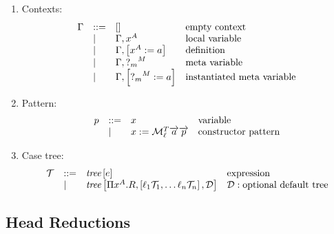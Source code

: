 \begin{enumerate}
    \item Contexts:
        $$
        \begin{array}{lllll} 
            \Gamma
            &::=&
            []
            &\text{empty context}
            \\
            &\mid&
            \Gamma, x^A
            &\text{local variable}
            \\
            &\mid&
            \Gamma, \left[ {x^A := a} \right]
            &\text{definition}
            \\
            &\mid&
            \Gamma, {?_{m}}^M
            &\text{meta variable}
            \\
            &\mid&
            \Gamma, \left[ {{?_{m}}^M := a} \right]
            &\text{instantiated meta variable}
         \end{array}
        $$

    \item Pattern:
        $$
        \begin{array}{lllll} 
            p &::=& x & \text{variable}
            \\
            &\mid& x := {\cal M}^T_\ell {\overrightarrow {a}} {\overrightarrow {p}}
            & \text{constructor pattern}
         \end{array}
        $$


    \item Case tree:
        $$
        \begin{array}{lllll} 
            {\mathcal T}
            &::=&
            {{\text{\it tree}} \left[ {e} \right]} & \text{expression}
            \\
            &\mid&
            {{\text{\it tree}} \left[ {
                \Pi x^A. R,
                \left[ {\ell_1 {{\mathcal T}}_1, \ldots \ell_n {{\mathcal T}}_n} \right],
                {\mathcal D}
            } \right]}
            & {\mathcal D}: \text{optional default tree}
         \end{array}
        $$
\end{enumerate}





\subsection{Head Reductions}

